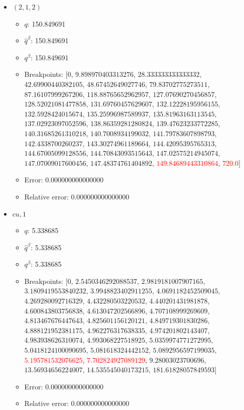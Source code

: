 \documentclass{article}%
\begin{document}
\begin{itemize}
\begin{itemize}
		\item Relative error: 0.000000000000000%
	\end{itemize}%
	\item $(2, 1, 2)$%
	\begin{itemize}%
		\item $q$: 150.849691%
		\item $\hat{q}^\beta$: 150.849691%
		\item $q^\beta$: 150.849691%
		\item Breakpoints: $[$$0$, $9.898970403313276$, $28.333333333333332$, $42.69900440382105$, $48.67452649027746$, $79.83702775273511$, $87.16107999267206$, $118.88765652962957$, $127.07690270456857$, $128.52021081477858$, $131.69760457629607$, $132.12228195956155$, $132.5928424015674$, $135.25996987589937$, $135.81963163113545$, $137.02923097052596$, $138.86359281280824$, $139.47623233772285$, $140.31685261310218$, $140.7008934199032$, $141.79783607898793$, $142.4338700260237$, $143.30274961189664$, $144.42095395765313$, $144.67005099128556$, $144.70843093515643$, $147.02575214945074$, $147.07009017600456$, $147.48374761404892$, \textcolor{red}{$149.84689443310864$}, \textcolor{red}{$720.0$}$]$%
		\item Error: 0.000000000000000%
		\item Relative error: 0.000000000000000%
	\end{itemize}%
	\item $\textit{cu},1$%
	\begin{itemize}%
		\item $q$: 5.338685%
		\item $\hat{q}^\beta$: 5.338685%
		\item $q^\beta$: 5.338685%
		\item Breakpoints: $[$$0$, $2.5450346292088537$, $2.9819181007907165$, $3.1809419553840232$, $3.9948823402911255$, $4.0691182452509045$, $4.269280092716329$, $4.432280503220532$, $4.440201431981878$, $4.600843803756838$, $4.613047202566896$, $4.707108999269609$, $4.813467676447643$, $4.825601156120121$, $4.849719301830286$, $4.888121952381175$, $4.962276317638335$, $4.974201802143407$, $4.983938626310074$, $4.993068227518925$, $5.0359974771272995$, $5.0418124100090695$, $5.081618324442152$, $5.0892956597199035$, \textcolor{red}{$5.195781532076625$}, \textcolor{red}{$7.702824927089129$}, $9.28003023700696$, $13.56934656224007$, $14.535545040173215$, $181.61828057849593$$]$%
		\item Error: 0.000000000000000%
		\item Relative error: 0.000000000000000%

\end{itemize}
\end{itemize}
\end{document}

